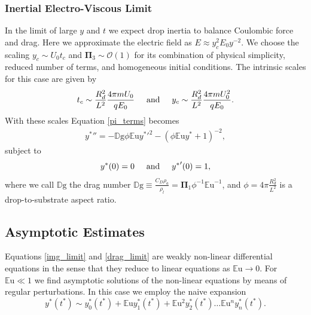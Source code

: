 \documentclass[aip,reprint, floatfix]{revtex4-1}
\begin{document}
\subsubsection{Inertial Electro-Viscous Limit}
In the limit of large $y$ and $t$ we expect drop inertia to balance Coulombic force and drag. Here we approximate the electric field as $E \approx y_c^2 E_0 y^{-2}$. We choose the scaling $y_c \sim U_0 t_c$ and $\mathbf{\Pi}_3 \sim \mathcal{O}(1)$ for its combination of physical simplicity, reduced number of terms, and homogeneous initial conditions. The intrinsic scales for this case are given by
\[ t_c \sim \frac{R_d^2}{L^2} \frac{4 \pi m U_0}{q E_0} \hspace{5mm} \mbox{and} \hspace{5 mm} y_c \sim \frac{R_d^2}{L^2} \frac{4 \pi m U_0^2}{q E_0}.
\]
With these scales Equation \ref{pi_terms} becomes 
\begin{eqnarray}
&{y^*}'' = - \mathbb{D}\mbox{g} \phi \mathbb{E}\mbox{u} {y^*}'^2 - \left( \phi \mathbb{E}\mbox{u} {y^*} + 1 \right)^{-2}, & \label{drag_limit}
\end{eqnarray}
subject to 
\begin{equation*}
{y^*}(0) = 0 \hspace{5 mm} \mbox{and} \hspace{5 mm} {y^*}'(0) = 1, 
\end{equation*}
where we call $\mathbb{D}\mbox{g}$ the drag number $\mathbb{D}\mbox{g} \equiv \frac{C_D \rho_a}{\rho_l} = \mathbf{\Pi}_1 \phi^{-1}{\mathbb{E}\mbox{u}}^{-1}$, and $\phi = 4 \pi \frac{R_d^2}{L^2}$ is a drop-to-substrate aspect ratio.

\subsection{Asymptotic Estimates}
Equations \ref{img_limit} and \ref{drag_limit} are weakly non-linear differential equations in the sense that they reduce to linear equations as $\mathbb{E}\mbox{u} \rightarrow 0$. For $\mathbb{E}\mbox{u} \ll 1$ we find asymptotic solutions of the non-linear equations by means of regular perturbations. In this case we employ the naive expansion
\begin{equation}
{y^*}({t^*}) \sim y^*_0({t^*}) + \mathbb{E}\mbox{u} y^*_1({t^*}) + \mathbb{E}\mbox{u}^2 y^*_2({t^*}) \ldots \mathbb{E}\mbox{u}^n y^*_n ({t^*})  . \label{regular_pert}
\end{equation}
\end{document}
